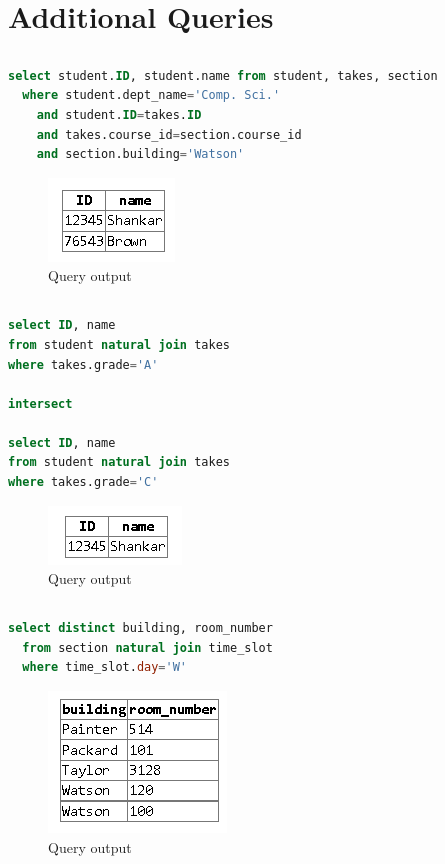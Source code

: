 \documentclass{article}
\begin{document}
\section{Additional Queries}
\subsection{}
\begin{lstlisting}[language=sql]
  select student.ID, student.name from student, takes, section 
  where student.dept_name='Comp. Sci.' 
    and student.ID=takes.ID 
    and takes.course_id=section.course_id 
    and section.building='Watson'
\end{lstlisting}
\begin{figure}[!ht]
  \begin{center}
  \includegraphics[scale=1]{4_a.png}
  \caption{Query output}
  \end{center}
\end{figure}

\subsection{}
\begin{lstlisting}[language=sql]
select ID, name 
from student natural join takes 
where takes.grade='A'

intersect

select ID, name 
from student natural join takes 
where takes.grade='C'
\end{lstlisting}
\begin{figure}[!ht]
  \begin{center}
  \includegraphics[scale=1]{4_b.png}
  \caption{Query output}
  \end{center}
\end{figure}


\subsection{}
\begin{lstlisting}[language=sql]
  select distinct building, room_number
  from section natural join time_slot
  where time_slot.day='W'
\end{lstlisting}
\begin{figure}[!ht]
  \begin{center}
  \includegraphics[scale=1]{4_c.png}
  \caption{Query output}
  \end{center}
\end{figure}
\end{document}
